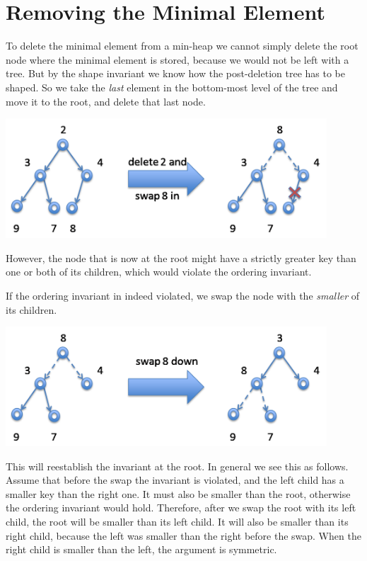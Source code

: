 \section{Removing the Minimal Element}
\label{sec:pq:removing}

To delete the minimal element from a min-heap we cannot simply delete
the root node where the minimal element is stored, because we would
not be left with a tree.  But by the shape invariant we know how the
post-deletion tree has to be shaped.  So we take the \emph{last}
element in the bottom-most level of the tree and move it to the root,
and delete that last node.
\begin{center}
  \includegraphics[width=0.9\textwidth]{img/delete2.png}
\end{center}
However, the node that is now at the root might have a strictly
greater key than one or both of its children, which would violate the
ordering invariant.

If the ordering invariant in indeed violated, we swap the node
with the \emph{smaller} of its children.
\begin{center}
  \includegraphics[width=0.9\textwidth]{img/swap8down-a.png}
\end{center}

This will reestablish the invariant at the root.  In general we see
this as follows.  Assume that before the swap the invariant is
violated, and the left child has a smaller key than the right one.  It
must also be smaller than the root, otherwise the ordering invariant
would hold.  Therefore, after we swap the root with its left child,
the root will be smaller than its left child.  It will also be smaller
than its right child, because the left was smaller than the right
before the swap.  When the right child is smaller than the left, the
argument is symmetric.

